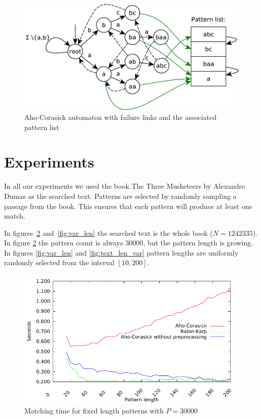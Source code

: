\documentclass[final]{beamer}
\begin{document}
\begin{poster}
\begin{figure}
\centering
 \includegraphics[width=25cm]{aho_corasick.pdf}
\caption{Aho-Corasick automaton with failure links and the associated pattern list}
\label{fig:ac_machine}
\end{figure}

\vspace{5mm}
\section{Experiments}
In all our experiments we used the book The Three Musketeers by Alexandre Dumas as the
searched text.
Patterns are selected by randomly sampling a passage from the book.
This ensures that each pattern will produce at least one match.

In figures~\ref{fig:fixed_len} and~\ref{fig:var_len} the searched text is the whole book ($N=1242335$).
%
% 
In figure \ref{fig:fixed_len} the pattern count is always 30000, but the pattern length is
growing.
In figures \ref{fig:var_len} and \ref{fig:text_len_var} pattern lengths are uniformly randomly selected from the interval $[10,200]$.

\newcolumn
\begin{figure}
\centering
 \includegraphics[width=25cm]{fixed_len.pdf}
\caption{Matching time for fixed length patterns with $P=30000$}
\label{fig:fixed_len}
\end{figure}


\end{poster}
\end{document}
